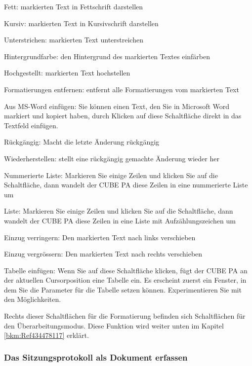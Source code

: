 \begin{compactitem}
\item Fett: markierten Text in Fettschrift darstellen
\item Kursiv: markierten Text in Kursivschrift darstellen
\item Unterstrichen: markierten Text unterstreichen
\item Hintergrundfarbe: den Hintergrund des markierten Textes einfärben
\item Hochgestellt: markierten Text hochstellen
\item Formatierungen entfernen: entfernt alle Formatierungen vom markierten Text
\item Aus MS-Word einfügen: Sie können einen Text, den Sie in Microsoft Word markiert und kopiert haben, durch Klicken auf
diese Schaltfläche direkt in das Textfeld einfügen.
\item Rückgängig: Macht die letzte Änderung rückgängig
\item Wiederherstellen: stellt eine rückgängig gemachte Änderung wieder her
\item Nummerierte Liste: Markieren Sie einige Zeilen und klicken Sie auf die Schaltfläche, dann wandelt der CUBE PA diese
Zeilen in eine nummerierte Liste um
\item Liste: Markieren Sie einige Zeilen und klicken Sie auf die Schaltfläche, dann wandelt der CUBE PA diese Zeilen in eine
Liste mit Aufzählungszeichen um
\item Einzug verringern: Den markierten Text nach links verschieben
\item Einzug vergrössern: Den markierten Text nach rechts verschieben
\item Tabelle einfügen: Wenn Sie auf diese Schaltfläche klicken, fügt der CUBE PA an der aktuellen Cursorposition eine Tabelle
ein. Es erscheint zuerst ein Fenster, in dem Sie die Parameter für die Tabelle setzen können. Experimentieren Sie mit
den Möglichkeiten.
\end{compactitem}

\vspace{\baselineskip}

\begin{sloppypar}
Rechts dieser Schaltflächen für die Formatierung befinden sich Schaltflächen für den Überarbeitungsmodus. Diese Funktion wird weiter unten im Kapitel \ref{bkm:Ref434478117} erklärt.
\end{sloppypar}

\subsubsection{Das Sitzungsprotokoll als Dokument erfassen}

